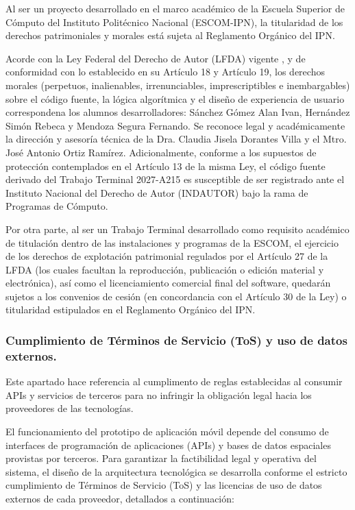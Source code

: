Al ser un proyecto desarrollado en el marco académico de la Escuela Superior de Cómputo del Instituto Politécnico Nacional (ESCOM-IPN), la titularidad de los derechos patrimoniales y morales está sujeta al Reglamento Orgánico del IPN.

Acorde con la Ley Federal del Derecho de Autor (LFDA) vigente \cite{LFDA_ley}, y de conformidad con lo establecido en su Artículo 18 y Artículo 19, los derechos morales (perpetuos, inalienables, irrenunciables, imprescriptibles e inembargables) sobre el código fuente, la lógica algorítmica y el diseño de experiencia de usuario correspondena los alumnos desarrolladores: Sánchez Gómez Alan Ivan, Hernández Simón Rebeca y Mendoza Segura Fernando. Se reconoce legal y académicamente la dirección y asesoría técnica de la Dra. Claudia Jisela Dorantes Villa y el Mtro. José Antonio Ortiz Ramírez. Adicionalmente, conforme a los supuestos de protección contemplados en el Artículo 13 de la misma Ley, el código fuente derivado del Trabajo Terminal 2027-A215 es susceptible de ser registrado ante el Instituto Nacional del Derecho de Autor (INDAUTOR) bajo la rama de Programas de Cómputo.

Por otra parte, al ser un Trabajo Terminal desarrollado como requisito académico de titulación dentro de las instalaciones y programas de la ESCOM, el ejercicio de los derechos de explotación patrimonial regulados por el Artículo 27 de la LFDA (los cuales facultan la reproducción, publicación o edición material y electrónica), así como el licenciamiento comercial final del software, quedarán sujetos a los convenios de cesión (en concordancia con el Artículo 30 de la Ley) o titularidad estipulados en el Reglamento Orgánico del IPN.

\subsubsection{Cumplimiento de Términos de Servicio (ToS) y uso de datos externos.}
Este apartado hace referencia al cumplimento de reglas establecidas al consumir APIs y servicios de terceros para no infringir la obligación legal hacia los proveedores de las tecnologías.  

El funcionamiento del prototipo de aplicación móvil depende del consumo de interfaces de programación de aplicaciones (APIs) y bases de datos espaciales provistas por terceros. Para garantizar la factibilidad legal y operativa del sistema, el diseño de la arquitectura tecnológica se desarrolla conforme el estricto cumplimiento de Términos de Servicio (ToS) y las licencias de uso de datos externos de cada proveedor, detallados a continuación: 

